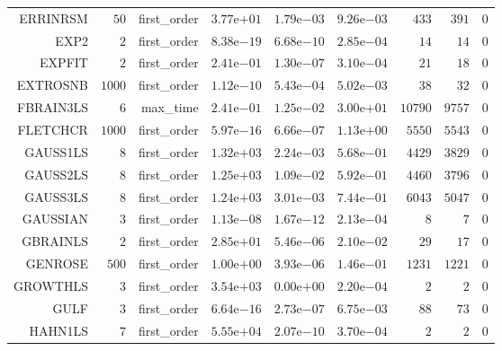 \begin{longtable}{rrrrrrrrr}
ERRINRSM & \(    50\) & first\_order & \( 3.77\)e\(+01\) & \( 1.79\)e\(-03\) & \( 9.26\)e\(-03\) & \(   433\) & \(   391\) & \(     0\) \\
EXP2 & \(     2\) & first\_order & \( 8.38\)e\(-19\) & \( 6.68\)e\(-10\) & \( 2.85\)e\(-04\) & \(    14\) & \(    14\) & \(     0\) \\
EXPFIT & \(     2\) & first\_order & \( 2.41\)e\(-01\) & \( 1.30\)e\(-07\) & \( 3.10\)e\(-04\) & \(    21\) & \(    18\) & \(     0\) \\
EXTROSNB & \(  1000\) & first\_order & \( 1.12\)e\(-10\) & \( 5.43\)e\(-04\) & \( 5.02\)e\(-03\) & \(    38\) & \(    32\) & \(     0\) \\
FBRAIN3LS & \(     6\) & max\_time & \( 2.41\)e\(-01\) & \( 1.25\)e\(-02\) & \( 3.00\)e\(+01\) & \( 10790\) & \(  9757\) & \(     0\) \\
FLETCHCR & \(  1000\) & first\_order & \( 5.97\)e\(-16\) & \( 6.66\)e\(-07\) & \( 1.13\)e\(+00\) & \(  5550\) & \(  5543\) & \(     0\) \\
GAUSS1LS & \(     8\) & first\_order & \( 1.32\)e\(+03\) & \( 2.24\)e\(-03\) & \( 5.68\)e\(-01\) & \(  4429\) & \(  3829\) & \(     0\) \\
GAUSS2LS & \(     8\) & first\_order & \( 1.25\)e\(+03\) & \( 1.09\)e\(-02\) & \( 5.92\)e\(-01\) & \(  4460\) & \(  3796\) & \(     0\) \\
GAUSS3LS & \(     8\) & first\_order & \( 1.24\)e\(+03\) & \( 3.01\)e\(-03\) & \( 7.44\)e\(-01\) & \(  6043\) & \(  5047\) & \(     0\) \\
GAUSSIAN & \(     3\) & first\_order & \( 1.13\)e\(-08\) & \( 1.67\)e\(-12\) & \( 2.13\)e\(-04\) & \(     8\) & \(     7\) & \(     0\) \\
GBRAINLS & \(     2\) & first\_order & \( 2.85\)e\(+01\) & \( 5.46\)e\(-06\) & \( 2.10\)e\(-02\) & \(    29\) & \(    17\) & \(     0\) \\
GENROSE & \(   500\) & first\_order & \( 1.00\)e\(+00\) & \( 3.93\)e\(-06\) & \( 1.46\)e\(-01\) & \(  1231\) & \(  1221\) & \(     0\) \\
GROWTHLS & \(     3\) & first\_order & \( 3.54\)e\(+03\) & \( 0.00\)e\(+00\) & \( 2.20\)e\(-04\) & \(     2\) & \(     2\) & \(     0\) \\
GULF & \(     3\) & first\_order & \( 6.64\)e\(-16\) & \( 2.73\)e\(-07\) & \( 6.75\)e\(-03\) & \(    88\) & \(    73\) & \(     0\) \\
HAHN1LS & \(     7\) & first\_order & \( 5.55\)e\(+04\) & \( 2.07\)e\(-10\) & \( 3.70\)e\(-04\) & \(     2\) & \(     2\) & \(     0\) \\

\end{longtable}
